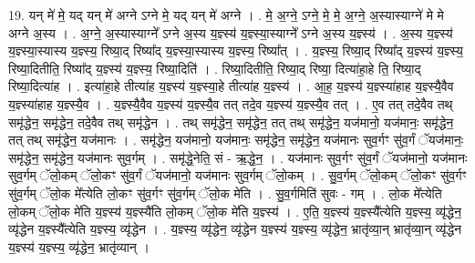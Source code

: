 \documentclass[17pt]{extarticle}
\begin{document}
19. यन् मे॑ मे॒ यद् यन् मे॑ अग्ने ऽग्ने मे॒ यद् यन् मे॑ अग्ने । . मे॒ अ॒ग्ने॒ ऽग्ने॒ मे॒ मे॒ अ॒ग्ने॒ अ॒स्यास्याग्ने॑ मे मे अग्ने अ॒स्य । . अ॒ग्ने॒ अ॒स्यास्याग्ने᳚ ऽग्ने अ॒स्य य॒ज्ञ्स्य॑ य॒ज्ञ्स्या॒स्याग्ने᳚ ऽग्ने अ॒स्य य॒ज्ञ्स्य॑ । . अ॒स्य य॒ज्ञ्स्य॑ य॒ज्ञ्स्या॒स्यास्य य॒ज्ञ्स्य॒ रिष्या॒द् रिष्या᳚द् य॒ज्ञ्स्या॒स्यास्य य॒ज्ञ्स्य॒ रिष्या᳚त् । . य॒ज्ञ्स्य॒ रिष्या॒द् रिष्या᳚द् य॒ज्ञ्स्य॑ य॒ज्ञ्स्य॒ रिष्या॒दितीति॒ रिष्या᳚द् य॒ज्ञ्स्य॑ य॒ज्ञ्स्य॒ रिष्या॒दिति॑ । . रिष्या॒दितीति॒ रिष्या॒द् रिष्या॒ दित्या॑हा॒हे ति॒ रिष्या॒द् रिष्या॒दित्या॑ह । . इत्या॑हा॒हे तीत्या॑ह य॒ज्ञ्स्य॑ य॒ज्ञ्स्या॒हे तीत्या॑ह य॒ज्ञ्स्य॑ । . आ॒ह॒ य॒ज्ञ्स्य॑ य॒ज्ञ्स्या॑हाह य॒ज्ञ्स्यै॒वैव य॒ज्ञ्स्या॑हाह य॒ज्ञ्स्यै॒व । . य॒ज्ञ्स्यै॒वैव य॒ज्ञ्स्य॑ य॒ज्ञ्स्यै॒व तत् तदे॒व य॒ज्ञ्स्य॑ य॒ज्ञ्स्यै॒व तत् । . ए॒व तत् तदे॒वैव तथ् समृ॑द्धेन॒ समृ॑द्धेन॒ तदे॒वैव तथ् समृ॑द्धेन । . तथ् समृ॑द्धेन॒ समृ॑द्धेन॒ तत् तथ् समृ॑द्धेन॒ यज॑मानो॒ यज॑मानः॒ समृ॑द्धेन॒ तत् तथ् समृ॑द्धेन॒ यज॑मानः । . समृ॑द्धेन॒ यज॑मानो॒ यज॑मानः॒ समृ॑द्धेन॒ समृ॑द्धेन॒ यज॑मानः सुव॒र्गꣳ सु॑व॒र्गं ॅयज॑मानः॒ समृ॑द्धेन॒ समृ॑द्धेन॒ यज॑मानः सुव॒र्गम् । . समृ॑द्धे॒नेति॒ सं - ऋ॒द्धे॒न॒ । . यज॑मानः सुव॒र्गꣳ सु॑व॒र्गं ॅयज॑मानो॒ यज॑मानः सुव॒र्गम् ॅलो॒कम् ॅलो॒कꣳ सु॑व॒र्गं ॅयज॑मानो॒ यज॑मानः सुव॒र्गम् ॅलो॒कम् । . सु॒व॒र्गम् ॅलो॒कम् ॅलो॒कꣳ सु॑व॒र्गꣳ सु॑व॒र्गम् ॅलो॒क मे᳚त्येति लो॒कꣳ सु॑व॒र्गꣳ सु॑व॒र्गम् ॅलो॒क मे॑ति । . सु॒व॒र्गमिति॑ सुवः - गम् । . लो॒क मे᳚त्येति लो॒कम् ॅलो॒क मे॑ति य॒ज्ञ्स्य॑ य॒ज्ञ्स्यै॑ति लो॒कम् ॅलो॒क मे॑ति य॒ज्ञ्स्य॑ । . ए॒ति॒ य॒ज्ञ्स्य॑ य॒ज्ञ्स्यै᳚त्येति य॒ज्ञ्स्य॒ व्यृ॑द्धेन॒ व्यृ॑द्धेन य॒ज्ञ्स्यै᳚त्येति य॒ज्ञ्स्य॒ व्यृ॑द्धेन । . य॒ज्ञ्स्य॒ व्यृ॑द्धेन॒ व्यृ॑द्धेन य॒ज्ञ्स्य॑ य॒ज्ञ्स्य॒ व्यृ॑द्धेन॒ भ्रातृ॑व्या॒न् भ्रातृ॑व्या॒न् व्यृ॑द्धेन य॒ज्ञ्स्य॑ य॒ज्ञ्स्य॒ व्यृ॑द्धेन॒ भ्रातृ॑व्यान् । \newline
\end{document}
